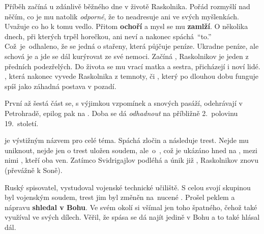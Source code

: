 \documentclass[FGBook.tex]{subfiles}
\begin{document}
\noindent 
Příběh začíná u zdánlivě běžného dne v životě Raskolnika.
Pořád rozmyšlí nad něčím, co je mu natolik \textit{odporné}, že to neadresuje ani ve svých myšlenkách.
Uvažuje co ho k tomu vedlo.
Přitom \textbf{ochoří} a mysl se mu \textbf{zamlží}.
O několika dnech, při kterých trpěl horečkou, ani neví a nakonec spáchá~\enquote{to.}
Což~je~odhaleno, že se jedná o  stařeny, která půjčuje peníze.
Ukradne peníze, ale schová je a jde se dál kurýrovat ze své nemoci.
Začíná , Raskolnikov je jeden z předních podezřelých.
Do života se mu vrací matka a sestra, přicházejí i noví lidé.
, která nakonec vyvede Raskolnika z temnoty, či , který po dlouhou dobu funguje spíš jako záhadná postava v pozadí.

\noindent 
První až šestá část se, s výjimkou vzpomínek a snových pasáží, odehrávají v Petrohradě, epilog pak na .
Doba se dá \textit{odhadnout} na příbližně 2.~polovinu 19.~století.

\noindent 
{} je výstižným názvem pro celé téma.
Spáchá zločin a následuje trest.
Nejde mu uniknout, nejde jen o trest uložen soudem, ale~o~, což je ukázáno hned na , mezi nimi , kteří oba  ven.
Zatímco Svidrigajlov podléhá a únik již , Raskolnikov znovu  (převážně k Soně).






\noindent 
Ruský spisovatel, vystudoval vojenské technické učiliště.
S celou svojí skupinou byl  vojenským soudem, trest jim byl změněn na~nucené .
Prošel peklem a nápravu \textbf{shledal v Bohu}.
Ve svém okolí si všímal jen toho špatného, čehož také využíval ve svých dílech.
Věřil, že spása se dá najít jedině v Bohu a to také hlásal dál.
\end{document}
